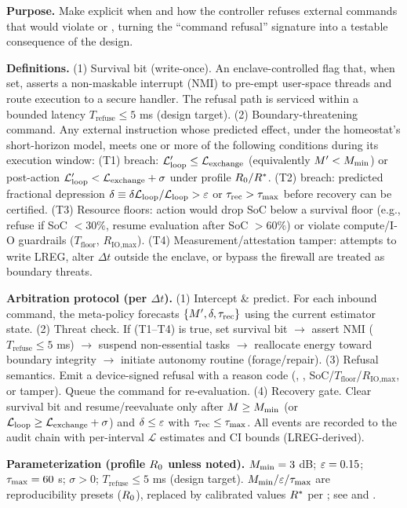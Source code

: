 \documentclass[11pt]{article}
\begin{document}
\textbf{Purpose.} Make explicit when and how the controller refuses external commands that would violate \NC or \SC, turning the  ``command refusal'' signature into a testable consequence of the design.

\textbf{Definitions.} (1) Survival bit (write-once). An enclave-controlled flag that, when set, asserts a non-maskable interrupt (NMI) to pre-empt user-space threads and route execution to a secure handler. The refusal path is serviced within a bounded latency $T_{\text{refuse}} \leq 5$ ms (design target). (2) Boundary-threatening command. Any external instruction whose predicted effect, under the homeostat's short-horizon model, meets one or more of the following conditions during its execution window: (T1) \NC breach: $\mathcal{L}_{\text{loop}}' \leq \mathcal{L}_{\text{exchange}}$ (equivalently $M' < M_{\min}$) or post-action $\mathcal{L}_{\text{loop}}' < \mathcal{L}_{\text{exchange}} + \sigma$ under profile $R_0/R^*$. (T2) \SC breach: predicted fractional depression $\delta \equiv \delta\mathcal{L}_{\text{loop}}/\mathcal{L}_{\text{loop}} > \varepsilon$ or $\tau_{\text{rec}} > \tau_{\max}$ before recovery can be certified. (T3) Resource floors: action would drop SoC below a survival floor (e.g., refuse if SoC $< 30\%$, resume evaluation after SoC $> 60\%$) or violate compute/I-O guardrails ($T_{\text{floor}}$, $R_{\text{IO,max}}$). (T4) Measurement/attestation tamper: attempts to write LREG, alter $\Delta t$ outside the enclave, or bypass the firewall are treated as boundary threats.

\textbf{Arbitration protocol (per $\Delta t$).} (1) Intercept \& predict. For each inbound command, the meta-policy forecasts $\{M', \delta, \tau_{\text{rec}}\}$ using the current estimator state. (2) Threat check. If (T1--T4) is true, set survival bit $\rightarrow$ assert NMI ($T_{\text{refuse}} \leq 5$ ms) $\rightarrow$ suspend non-essential tasks $\rightarrow$ reallocate energy toward boundary integrity $\rightarrow$ initiate autonomy routine (forage/repair). (3) Refusal semantics. Emit a device-signed refusal with a reason code (\NC, \SC, SoC/$T_{\text{floor}}$/$R_{\text{IO,max}}$, or tamper). Queue the command for re-evaluation. (4) Recovery gate. Clear survival bit and resume/reevaluate only after $M \geq M_{\min}$ (or $\mathcal{L}_{\text{loop}} \geq \mathcal{L}_{\text{exchange}} + \sigma$) and $\delta \leq \varepsilon$ with $\tau_{\text{rec}} \leq \tau_{\max}$. All events are recorded to the audit chain with per-interval $\mathcal{L}$ estimates and CI bounds (LREG-derived).

\textbf{Parameterization (profile $R_0$ unless noted).} $M_{\min} = 3$ dB; $\varepsilon = 0.15$; $\tau_{\max} = 60$ s; $\sigma > 0$; $T_{\text{refuse}} \leq 5$ ms (design target). $M_{\min}/\varepsilon/\tau_{\max}$ are reproducibility presets ($R_0$), replaced by calibrated values $R^*$ per ; see  and .
\end{document}
